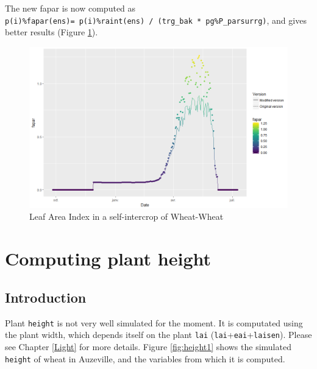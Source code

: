 \documentclass[
]{book}
\begin{document}
The new fapar is now computed as \texttt{p(i)\%fapar(ens)=\ p(i)\%raint(ens)\ /\ (trg\_bak\ *\ pg\%P\_parsurrg)}, and gives better results (Figure \ref{fig:FAPARcorrected}).

\begin{figure}
\centering
\includegraphics{img/FAPARcorrected.png}
\caption{\label{fig:FAPARcorrected}Leaf Area Index in a self-intercrop of Wheat-Wheat}
\end{figure}

\hypertarget{height}{%
\chapter{Computing plant height}\label{height}}

\hypertarget{introduction-7}{%
\section{Introduction}\label{introduction-7}}

Plant \texttt{height} is not very well simulated for the moment. It is computated using the plant width, which depends itself on the plant \texttt{lai} (\texttt{lai}+\texttt{eai}+\texttt{laisen}). Please see Chapter \ref{Light} for more details. Figure \ref{fig:height1} shows the simulated \texttt{height} of wheat in Auzeville, and the variables from which it is computed.
\end{document}
